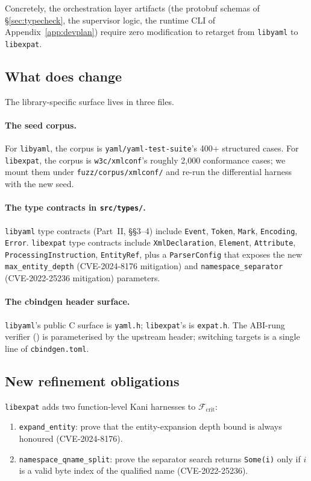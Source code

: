 \documentclass[12pt]{article}
\theoremstyle{definition}
\theoremstyle{remark}
\newcommand{\libyaml}{\texttt{libyaml}}
\newcommand{\libexpat}{\texttt{libexpat}}
\begin{document}
Concretely, the orchestration layer artifacts (the protobuf schemas
of \S{}\ref{sec:typecheck}, the supervisor logic, the runtime CLI of
Appendix~\ref{app:devplan}) require zero modification to retarget from
\libyaml{} to \libexpat{}.

\subsection{What does change}

The library-specific surface lives in three files.

\paragraph{The seed corpus.}
For \libyaml{}, the corpus is \texttt{yaml/yaml-test-suite}'s 400+
structured cases. For \libexpat{}, the corpus is \texttt{w3c/xmlconf}'s
roughly 2{,}000 conformance cases; we mount them under
\texttt{fuzz/corpus/xmlconf/} and re-run the differential harness with
the new seed.

\paragraph{The type contracts in \texttt{src/types/}.}
\libyaml{} type contracts (Part~II, \S{}\S{}3--4) include
\texttt{Event}, \texttt{Token}, \texttt{Mark}, \texttt{Encoding},
\texttt{Error}. \libexpat{} type contracts include
\texttt{XmlDeclaration}, \texttt{Element}, \texttt{Attribute},
\texttt{ProcessingInstruction}, \texttt{EntityRef}, plus a
\texttt{ParserConfig} that exposes the new
\texttt{max\_entity\_depth} (CVE-2024-8176 mitigation) and
\texttt{namespace\_separator} (CVE-2022-25236 mitigation) parameters.

\paragraph{The cbindgen header surface.}
\libyaml{}'s public C surface is \texttt{yaml.h};
\libexpat{}'s is \texttt{expat.h}. The ABI-rung verifier
() is parameterised by the upstream header; switching
targets is a single line of \texttt{cbindgen.toml}.

\subsection{New refinement obligations}

\libexpat{} adds two function-level Kani harnesses to
\(\mathcal{F}_{\mathrm{crit}}\):
\begin{enumerate}
\item \texttt{expand\_entity}: prove that the entity-expansion depth
  bound is always honoured (CVE-2024-8176).
\item \texttt{namespace\_qname\_split}: prove the separator search
  returns \texttt{Some(i)} only if \(i\) is a valid byte index of the
  qualified name (CVE-2022-25236).
\end{enumerate}
\end{document}
